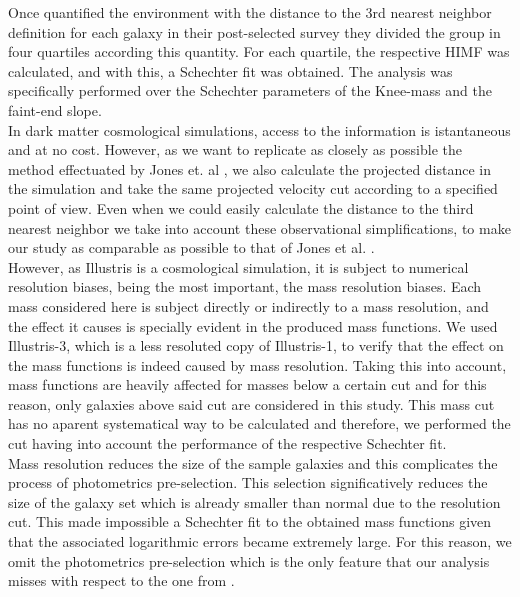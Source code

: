 \documentclass[a4paper,fleqn,usenatbib]{mnras}
\begin{document}
Once quantified the environment with the distance to the 3rd nearest
neighbor definition for each galaxy in their post-selected survey they
divided the group in four quartiles according this quantity. For each
quartile, the respective HIMF was calculated, and with this, a
Schechter fit was obtained. The analysis was specifically performed
over the Schechter parameters of the Knee-mass and the faint-end
slope. \\ 
 
In dark matter cosmological simulations, access to the information is
istantaneous and at no cost. However, as we want to replicate as
closely as possible the method effectuated by Jones et. al
\cite{jones1}, we also calculate the projected distance in the
simulation and take the same projected velocity cut according to a
specified point of view. Even when we could easily calculate the
distance to the third nearest neighbor we take into account these
observational simplifications, to make our study as comparable as
possible to that of Jones et al. \cite{jones1}.\\ 

However, as Illustris is a cosmological simulation, it is subject to numerical resolution biases, being the most important, the mass resolution biases. Each mass considered here is subject directly or indirectly to a mass resolution, and the effect it causes is specially evident in the produced mass functions. We used Illustris-3, which is a less resoluted copy of Illustris-1, to verify that the effect on the mass functions is indeed caused by mass resolution. Taking this into account, mass functions are heavily affected for masses below a certain cut and for this reason, only galaxies above said cut are considered in this study. This mass cut has no aparent systematical way to be calculated and therefore, we performed the cut having into account the performance of the respective Schechter fit.\\

Mass resolution reduces the size of the sample galaxies and this complicates the process of photometrics pre-selection. This selection significatively reduces the size of the galaxy set which is already smaller than normal due to the resolution cut. This made impossible a Schechter fit to the obtained mass functions given that the associated logarithmic errors became extremely large. For this reason, we omit the photometrics pre-selection which is the only feature that our analysis misses with respect to the one from \cite{jones1}.\\
\end{document}
